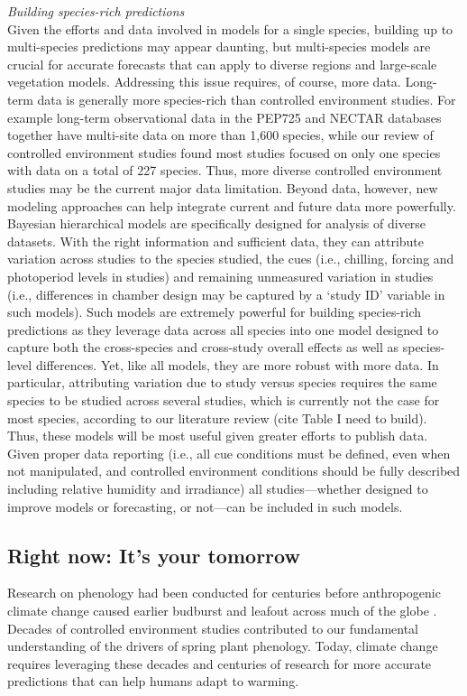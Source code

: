 \documentclass[11pt,letter]{article}
\begin{document}
\emph{Building species-rich predictions}\\
Given the efforts and data involved in models for a single species, building up to multi-species predictions may appear daunting, but multi-species models are crucial for accurate forecasts that can apply to diverse regions and large-scale vegetation models. Addressing this issue requires, of course, more data. Long-term data is generally more species-rich than controlled environment studies. For example long-term observational data in the PEP725 and NECTAR databases together have multi-site data on more than 1,600 species, while our review of controlled environment studies found most studies focused on only one species with data on a total of 227 species. Thus, more diverse controlled environment studies may be the current major data limitation. Beyond data, however, new modeling approaches can help integrate current and future data more powerfully. \\

Bayesian hierarchical models are specifically designed for analysis of diverse datasets. With the right information and sufficient data, they can attribute variation across studies to the species studied, the cues (i.e., chilling, forcing and photoperiod levels in studies) and remaining unmeasured variation in studies (i.e., differences in chamber design may be captured by a `study ID' variable in such models). Such models are extremely powerful for building species-rich predictions as they leverage data across all species into one model designed to capture both the cross-species and cross-study overall effects as well as species-level differences. Yet, like all models, they are more robust with more data. In particular, attributing variation due to study versus species requires the same species to be studied across several studies, which is currently not the case for most species, according to our literature review (cite Table I need to build). Thus, these models will be most useful given greater efforts to publish data. Given proper data reporting (i.e., all cue conditions must be defined, even when not manipulated, and controlled environment conditions should be fully described including relative humidity and irradiance) all studies---whether designed to improve models or forecasting, or not---can be included in such models. 

\subsection{Right now: It's your tomorrow}
Research on phenology had been conducted for centuries before anthropogenic climate change caused earlier budburst and leafout across much of the globe \citep{Sparks:1995mv}. Decades of controlled environment studies contributed to our fundamental understanding of the drivers of spring plant phenology. Today, climate change requires leveraging these decades and centuries of research for more accurate predictions that can help humans adapt to warming. \\
\end{document}
